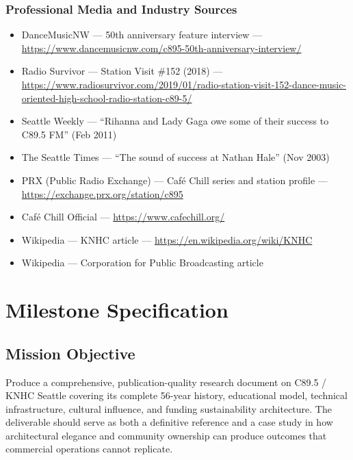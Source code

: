 \documentclass[11pt,letterpaper]{article}
\newcommand{\stageheader}[2]{%
  \noindent\colorbox{#2}{\makebox[\textwidth][l]{%
    \textcolor{white}{\bfseries\sffamily\hspace{6pt}#1\hspace{6pt}}}}%
  \vspace{0.5em}\par%
}
\begin{document}
\subsubsection{Professional Media and Industry Sources}
\begin{itemize}[leftmargin=2em]
\item DanceMusicNW --- 50th anniversary feature interview --- \url{https://www.dancemusicnw.com/c895-50th-anniversary-interview/}
\item Radio Survivor --- Station Visit \#152 (2018) --- \url{https://www.radiosurvivor.com/2019/01/radio-station-visit-152-dance-music-oriented-high-school-radio-station-c89-5/}
\item Seattle Weekly --- ``Rihanna and Lady Gaga owe some of their success to C89.5 FM'' (Feb 2011)
\item The Seattle Times --- ``The sound of success at Nathan Hale'' (Nov 2003)
\item PRX (Public Radio Exchange) --- Café Chill series and station profile --- \url{https://exchange.prx.org/station/c895}
\item Café Chill Official --- \url{https://www.cafechill.org/}
\item Wikipedia --- KNHC article --- \url{https://en.wikipedia.org/wiki/KNHC}
\item Wikipedia --- Corporation for Public Broadcasting article
\end{itemize}


\newpage
\stageheader{STAGE 3 --- MISSION PACKAGE}{tertiary}

\section{Milestone Specification}

\subsection{Mission Objective}

Produce a comprehensive, publication-quality research document on C89.5 / KNHC Seattle covering its complete 56-year history, educational model, technical infrastructure, cultural influence, and funding sustainability architecture. The deliverable should serve as both a definitive reference and a case study in how architectural elegance and community ownership can produce outcomes that commercial operations cannot replicate.
\end{document}
